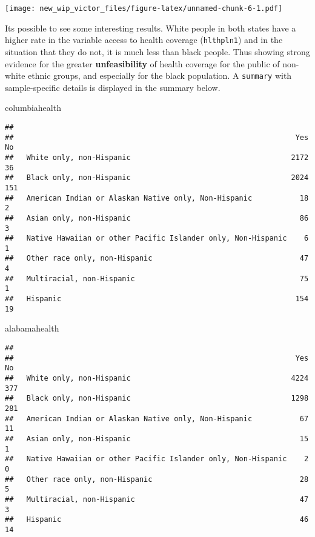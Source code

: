 \documentclass[]{article}
\newenvironment{Shaded}{\begin{snugshade}}{\end{snugshade}}
\newcommand{\NormalTok}[1]{#1}
\begin{document}
\texttt{[image: new\_wip\_victor\_files/figure-latex/unnamed-chunk-6-1.pdf]}

Its possible to see some interesting results. White people in both
states have a higher rate in the variable access to health coverage
(\texttt{hlthpln1}) and in the situation that they do not, it is much
less than black people. Thus showing strong evidence for the greater
\textbf{unfeasibility} of health coverage for the public of non-white
ethnic groups, and especially for the black population. A
\texttt{summary} with sample-specific details is displayed in the
summary below.

\begin{Shaded}
\begin{Highlighting}[]
\NormalTok{columbiahealth}
\end{Highlighting}
\end{Shaded}

\begin{verbatim}
##                                                               
##                                                                 Yes   No
##   White only, non-Hispanic                                     2172   36
##   Black only, non-Hispanic                                     2024  151
##   American Indian or Alaskan Native only, Non-Hispanic           18    2
##   Asian only, non-Hispanic                                       86    3
##   Native Hawaiian or other Pacific Islander only, Non-Hispanic    6    1
##   Other race only, non-Hispanic                                  47    4
##   Multiracial, non-Hispanic                                      75    1
##   Hispanic                                                      154   19
\end{verbatim}

\begin{Shaded}
\begin{Highlighting}[]
\NormalTok{alabamahealth}
\end{Highlighting}
\end{Shaded}

\begin{verbatim}
##                                                               
##                                                                 Yes   No
##   White only, non-Hispanic                                     4224  377
##   Black only, non-Hispanic                                     1298  281
##   American Indian or Alaskan Native only, Non-Hispanic           67   11
##   Asian only, non-Hispanic                                       15    1
##   Native Hawaiian or other Pacific Islander only, Non-Hispanic    2    0
##   Other race only, non-Hispanic                                  28    5
##   Multiracial, non-Hispanic                                      47    3
##   Hispanic                                                       46   14
\end{verbatim}
\end{document}
